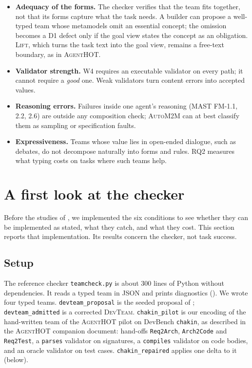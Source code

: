 \documentclass[10pt,a4paper]{article}
\newcommand{\tool}{\textsc{AgentHOT}}
\newcommand{\auto}{\textsc{AutoM2M}}
\newcommand{\W}[1]{\textsf{W#1}}
\newcommand{\D}[1]{\textsf{D#1}}
\newcommand{\devteam}{\textsc{DevTeam}}
\newcommand{\code}[1]{\texttt{#1}}
\newcommand{\file}[1]{\texttt{#1}}
\begin{document}
\begin{itemize}
\item \textbf{Adequacy of the forms.} The checker verifies that the team
fits together, not that its forms capture what the task needs. A builder
can propose a well-typed team whose metamodels omit an essential concept;
the omission becomes a \D{1} defect only if the goal view states the
concept as an obligation. \textsc{Lift}, which turns the task text into the
goal view, remains a free-text boundary, as in \tool{}.
\item \textbf{Validator strength.} \W{4} requires an executable validator on
every path; it cannot require a \emph{good} one. Weak validators turn
content errors into accepted values.
\item \textbf{Reasoning errors.} Failures inside one agent's reasoning (MAST
FM-1.1, 2.2, 2.6) are outside any composition check; \auto{} can at best
classify them as sampling or specification faults.
\item \textbf{Expressiveness.} Teams whose value lies in open-ended dialogue,
such as debates, do not decompose naturally into forms and rules. RQ2
measures what typing costs on tasks where such teams help.
\end{itemize}
\section{A first look at the checker}\label{sec:checkerstudy}

Before the studies of , we implemented the six conditions
to see whether they can be implemented as stated, what they catch, and
what they cost. This section reports that implementation. Its results
concern the checker, not task success.

\subsection{Setup}

The reference checker \file{teamcheck.py} is about 300 lines of Python
without dependencies. It reads a typed team in JSON and prints diagnostics
(). We wrote four typed teams. \file{devteam_proposal} is
the seeded proposal of ; \file{devteam_admitted} is a
corrected \devteam{}. \file{chakin_pilot} is our encoding of the
hand-written team of the \tool{} pilot on DevBench \texttt{chakin}, as
described in the \tool{} companion document: hand-offs \code{Req2Arch},
\code{Arch2Code} and \code{Req2Test}, a \code{parses} validator on
signatures, a \code{compiles} validator on code bodies, and an oracle
validator on test cases. \file{chakin_repaired} applies one delta to it
(below).
\end{document}
